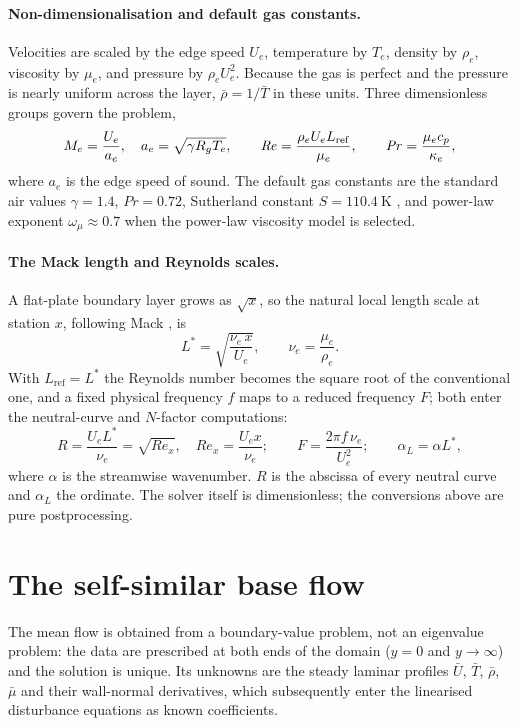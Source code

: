 \documentclass[11pt]{article}
\begin{document}
\paragraph{Non-dimensionalisation and default gas constants.} Velocities are scaled by the edge speed
$U_e$, temperature by $T_e$, density by $\rho_e$, viscosity by $\mu_e$, and pressure by $\rho_e U_e^2$.
Because the gas is perfect and the pressure is nearly uniform across the layer, $\bar\rho=1/\bar T$ in
these units. Three dimensionless groups govern the problem,
\begin{equation}\label{eq:groups}
  M_e=\frac{U_e}{a_e},\quad a_e=\sqrt{\gamma R_g T_e},\qquad
  \mathit{Re}=\frac{\rho_e U_e L_{\mathrm{ref}}}{\mu_e},\qquad
  \mathit{Pr}=\frac{\mu_e c_p}{\kappa_e},
\end{equation}
where $a_e$ is the edge speed of sound. The default gas constants are the standard air values
$\gamma=1.4$, $\mathit{Pr}=0.72$, Sutherland constant $S=110.4~\mathrm K$ \cite{sutherland1893}, and
power-law exponent $\omega_\mu\approx0.7$ when the power-law viscosity model is selected.

\paragraph{The Mack length and Reynolds scales.}\label{sec:Lstar} A flat-plate boundary layer grows as
$\sqrt x$, so the natural local length scale at station $x$, following Mack \cite{mack1984}, is
\begin{equation}\label{eq:Lstar}
  L^*=\sqrt{\frac{\nu_e\,x}{U_e}},\qquad \nu_e=\frac{\mu_e}{\rho_e}.
\end{equation}
With $L_{\mathrm{ref}}=L^*$ the Reynolds number becomes the square root of the conventional one, and a
fixed physical frequency $f$ maps to a reduced frequency $F$; both enter the neutral-curve and $N$-factor
computations:
\begin{equation}\label{eq:RF}
  R=\frac{U_eL^*}{\nu_e}=\sqrt{Re_x},\quad Re_x=\frac{U_ex}{\nu_e};\qquad
  F=\frac{2\pi f\,\nu_e}{U_e^2};\qquad \alpha_L=\alpha L^* ,
\end{equation}
where $\alpha$ is the streamwise wavenumber. $R$ is the abscissa of every neutral curve and $\alpha_L$
the ordinate. The solver itself is dimensionless; the conversions above are pure postprocessing.

\section{The self-similar base flow}\label{sec:base}
The mean flow is obtained from a boundary-value problem, not an eigenvalue problem: the data are
prescribed at both ends of the domain ($y=0$ and $y\to\infty$) and the solution is unique. Its unknowns
are the steady laminar profiles $\bar U$, $\bar T$, $\bar\rho$, $\bar\mu$ and their wall-normal
derivatives, which subsequently enter the linearised disturbance equations as known coefficients.
\end{document}
